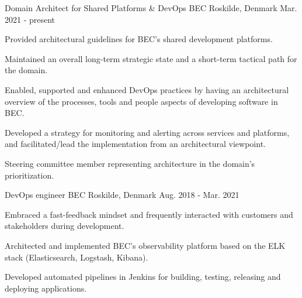 


\begin{cventries}

\cventry
{Domain Architect for Shared Platforms \& DevOps} %
{BEC} %
{Roskilde, Denmark} %
{Mar. 2021 - present} %
{ %
\begin{cvitems}
\item{Provided architectural guidelines for BEC's shared development platforms.}
\item{Maintained an overall long-term strategic state and a short-term tactical path for the domain.}
\item{Enabled, supported and enhanced DevOps practices by having an architectural overview of the processes, tools and people aspects of developing software in BEC.}
\item{Developed a strategy for monitoring and alerting across services and platforms, and facilitated/lead the implementation from an architectural viewpoint.}
\item{Steering committee member representing architecture in the domain's prioritization.}
\end{cvitems}
}
\cventry
{DevOps engineer} %
{BEC} %
{Roskilde, Denmark} %
{Aug. 2018 - Mar. 2021} %
{ %
\begin{cvitems}
\item{Embraced a fast-feedback mindset and frequently interacted with customers and stakeholders during development.}
\item Architected and implemented BEC's observability platform based on the ELK stack (Elasticsearch, Logstash, Kibana).
\item Developed automated pipelines in Jenkins for building, testing, releasing and deploying applications.

\end{cvitems}}
\end{cventries}
